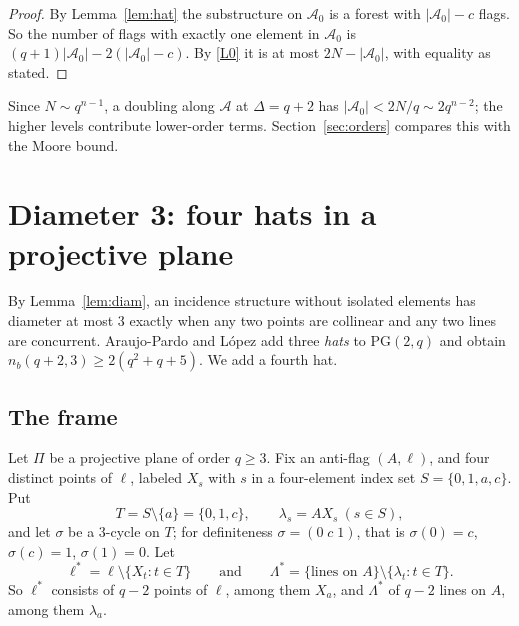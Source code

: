 \documentclass[11pt]{amsart}
\theoremstyle{definition}
\theoremstyle{remark}
\newcommand{\cA}{\mathcal{A}}
\newcommand{\PG}{\mathrm{PG}}
\newcommand{\lam}{\lambda}
\begin{document}
\begin{proof}
By Lemma~\ref{lem:hat} the substructure on $\cA_0$ is a forest with $|\cA_0|-c$ flags. So the number of flags with exactly one element in $\cA_0$ is $(q+1)|\cA_0|-2(|\cA_0|-c)$. By \ref{L0} it is at most $2N-|\cA_0|$, with equality as stated.
\end{proof}

Since $N\sim q^{n-1}$, a doubling along $\cA$ at $\Delta=q+2$ has $|\cA_0|<2N/q\sim 2q^{n-2}$; the higher levels contribute lower-order terms. Section~\ref{sec:orders} compares this with the Moore bound.

\section{Diameter 3: four hats in a projective plane}\label{sec:d3}

By Lemma~\ref{lem:diam}, an incidence structure without isolated elements has diameter at most $3$ exactly when any two points are collinear and any two lines are concurrent. Araujo-Pardo and L\'opez \cite{AL20} add three \emph{hats} to $\PG(2,q)$ and obtain $n_b(q+2,3)\ge2(q^2+q+5)$. We add a fourth hat.

\subsection{The frame}
Let $\Pi$ be a projective plane of order $q\ge3$. Fix an anti-flag $(A,\ell)$, and four distinct points of $\ell$, labeled $X_s$ with $s$ in a four-element index set $S=\{0,1,a,c\}$. Put
\[
T=S\setminus\{a\}=\{0,1,c\},\qquad \lam_s=AX_s\ (s\in S),
\]
and let $\sigma$ be a $3$-cycle on $T$; for definiteness $\sigma=(0\;c\;1)$, that is $\sigma(0)=c$, $\sigma(c)=1$, $\sigma(1)=0$. Let
\[
\ell^*=\ell\setminus\{X_t:t\in T\}\qquad\text{and}\qquad \Lambda^*=\{\text{lines on }A\}\setminus\{\lam_t:t\in T\}.
\]
So $\ell^*$ consists of $q-2$ points of $\ell$, among them $X_a$, and $\Lambda^*$ of $q-2$ lines on $A$, among them $\lam_a$.
\end{document}
